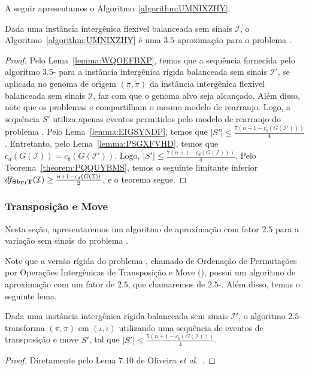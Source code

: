 A seguir apresentamos o Algoritmo~\ref{algorithm:UMNIXZHY}.



\begin{theorem}\label{theorem:PSELGHNY}
Dada uma instância intergênica flexível balanceada sem sinais $\mathcal{I}$, o Algoritmo~\ref{algorithm:UMNIXZHY} é uma $3.5$-aproximação para o problema \SbFIT{}.
\end{theorem}
\begin{proof}
Pelo Lema~\ref{lemma:WQOEFBXP}, temos que a sequência fornecida pelo algoritmo $3.5$-\SbIT{} para a instância intergênica rígida balanceada sem sinais $\mathcal{I'}$, se aplicada no genoma de origem $(\pi,\breve\pi)$ da instância intergênica flexível balanceada sem sinais $\mathcal{I}$, faz com que o genoma alvo seja alcançado. Além disso, note que os problemas \SbIT{} e \SbFIT{} compartilham o mesmo modelo de rearranjo. Logo, a sequência $S'$ utiliza apenas eventos permitidos pelo modelo de rearranjo do problema \SbFIT{}. Pelo Lema~\ref{lemma:EIGSYNDP}, temos que $|S'| \le \frac{7({n+1} - c_b(G(\mathcal{I}')))}{4}$. Entretanto, pelo Lema~\ref{lemma:PSGXFVHD}, temos que $c_d(G(\mathcal{I})) = c_b(G(\mathcal{I}'))$. Logo, $|S'| \le \frac{7({n+1} - c_d(G(\mathcal{I})))}{4}$. Pelo Teorema~\ref{theorem:PQQUYBMS}, temos o seguinte limitante inferior $df_{\textbf{Sb\textsubscript{FI}T}}(\mathcal{I}) \ge \frac{{n+1} - c_d(G(\mathcal{I}))}{2}$, e o teorema segue.
\end{proof}

\subsubsection{Transposição e Move}

Nesta seção, apresentaremos um algoritmo de aproximação com fator $2.5$ para a variação sem sinais do problema \SbFITM{}. 

Note que a versão rígida do problema \SbFITM{}, chamado de Ordenação de Permutações por Operações Intergênicas de Transposição e Move (\SbITM), possui um algoritmo de aproximação com um fator de $2.5$, que chamaremos de $2.5$-\SbITM{}. Além disso, temos o seguinte lema.

\begin{lemma}\label{lemma:PDDYJXYT}
Dada uma instância intergênica rígida balanceada sem sinais $\mathcal{I}'$, o algoritmo $2.5$-\SbITM{} transforma $(\pi,\breve\pi)$ em $(\iota,\breve\iota)$ utilizando uma sequência de eventos de transposição e move $S'$, tal que $|S'| \le \frac{5({n+1} - c_b(G(\mathcal{I})))}{4}$.
\end{lemma}
\begin{proof}
Diretamente pelo Lema 7.10 de Oliveira \textit{et al.}~\cite{2021a-oliveira-etal}.
\end{proof}

